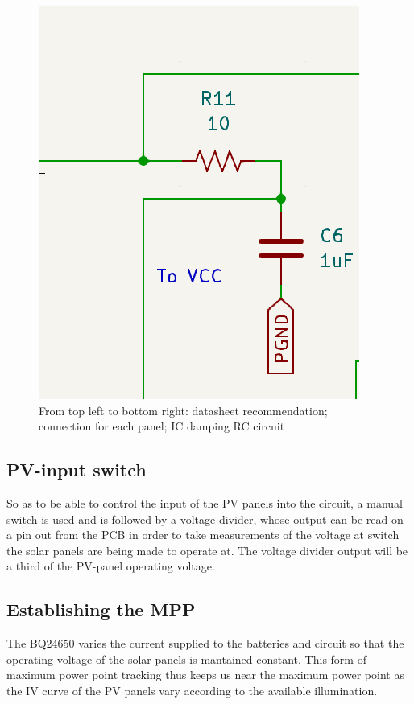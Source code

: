 \documentclass{article}
\begin{document}
\begin{figure}[h]
   	\includegraphics[scale = 0.5]{IC-filter}
	\caption{From top left to bottom right: datasheet recommendation; connection for each panel; IC damping RC circuit}
	\label{fig:mesh2}
\end{figure}



\subsection{PV-input switch}

So as to be able to control the input of the PV panels into the circuit, a manual switch is used and is followed by a voltage divider, whose output can be read on a pin out from the PCB in order to take measurements of the voltage at switch the solar panels are being made to operate at. The voltage divider output will be a third of the PV-panel operating voltage.

\subsection{Establishing the MPP}

The BQ24650 varies the current supplied to the batteries and circuit so that the operating voltage of the solar panels is mantained constant. This form of maximum power point tracking thus keeps us near the maximum power point as the IV curve of the PV panels vary according to the available illumination. 
\end{document}
